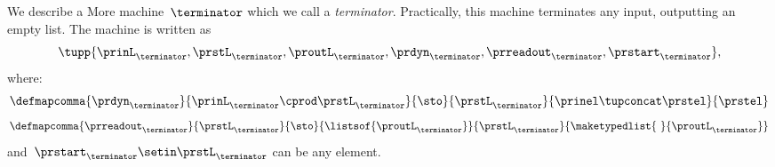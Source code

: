 \begin{example}[Terminator]
    We describe a More machine~$\terminator$ which we call a \emph{terminator}.
    Practically, this machine terminates any input, outputting an empty list.
    The machine is written as
    \begin{equation}
        \tupp{\prinL_{\terminator},\prstL_{\terminator},\proutL_{\terminator},\prdyn_{\terminator},\prreadout_{\terminator},\prstart_{\terminator}},
    \end{equation}
    where:
    \begin{equation}
        \defmapcomma{\prdyn_\terminator}
        {\prinL_\terminator \cprod \prstL_\terminator}
        {\sto}
        {\prstL_\terminator}
        {\prinel \tupconcat \prstel}
        {\prstel}
    \end{equation}
    \begin{equation}
        \defmapcomma{\prreadout_\terminator}
        {\prstL_\terminator}
        {\sto}
        {\listsof{\proutL_\terminator}}
        {\prstL_\terminator}
        {
            \maketypedlist{ \ }{\proutL_\terminator}
        }
    \end{equation}
    and~$\prstart_\terminator \setin \prstL_\terminator$ can be any element.
\end{example}


